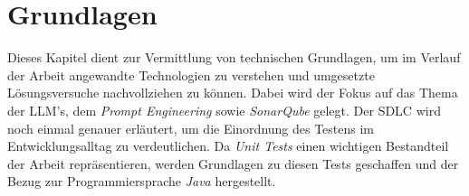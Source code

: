 
\chapter{Grundlagen}\label{chap:basics}
Dieses Kapitel dient zur Vermittlung von technischen Grundlagen, um im Verlauf der Arbeit angewandte Technologien zu verstehen und umgesetzte Lösungsversuche nachvollziehen zu können. Dabei wird der Fokus auf das Thema der LLM's, dem \textit{Prompt Engineering} sowie \textit{SonarQube} gelegt. Der SDLC wird noch einmal genauer erläutert, um die Einordnung des Testens im Entwicklungsalltag zu verdeutlichen. Da \textit{Unit Tests} einen wichtigen Bestandteil der Arbeit repräsentieren, werden Grundlagen zu diesen Tests geschaffen und der Bezug zur Programmiersprache \textit{Java} hergestellt.

